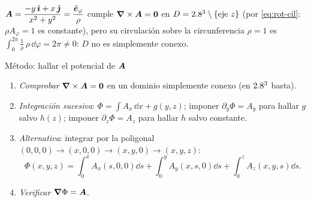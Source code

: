 \begin{observacion}
$\bm{A}=\dfrac{-y\,\hat{\bm{\imath}}+x\,\hat{\bm{\jmath}}}{x^{2}+y^{2}}=\dfrac{\hat{\bm{e}}_{\varphi}}{\rho}$ cumple
$\bm{\nabla}\times\bm{A}=\bm{0}$ en $D=2.8^{3}\setminus\{\text{eje }z\}$ (por \eqref{eq:rot-cil}:
$\rho A_{\varphi}=1$ es constante), pero su circulación sobre la circunferencia
$\rho=1$ es $\int_{0}^{2\pi}\tfrac{1}{\rho}\,\rho\,\dd\varphi=2\pi\neq0$: $D$ no es simplemente conexo.
\end{observacion}

\begin{clave}{Método: hallar el potencial de $\bm{A}$}
\begin{enumerate}[leftmargin=1.4em]
  \item \emph{Comprobar} $\bm{\nabla}\times\bm{A}=\bm{0}$ en un dominio simplemente conexo
        (en $2.8^{3}$ basta).
  \item \emph{Integración sucesiva}: $\Phi=\int A_{x}\,\dd x+g(y,z)$; imponer
        $\partial_{y}\Phi=A_{y}$ para hallar $g$ salvo $h(z)$; imponer
        $\partial_{z}\Phi=A_{z}$ para hallar $h$ salvo constante.
  \item \emph{Alternativa}: integrar por la poligonal
        $(0,0,0)\to(x,0,0)\to(x,y,0)\to(x,y,z)$:
        \begin{equation}
          \Phi(x,y,z)=\int_{0}^{x}\!A_{x}(s,0,0)\dd s+\int_{0}^{y}\!A_{y}(x,s,0)\dd s+\int_{0}^{z}\!A_{z}(x,y,s)\dd s .
          \label{eq:poligonal}
        \end{equation}
  \item \emph{Verificar} $\bm{\nabla}\Phi=\bm{A}$.
\end{enumerate}
\end{clave}
